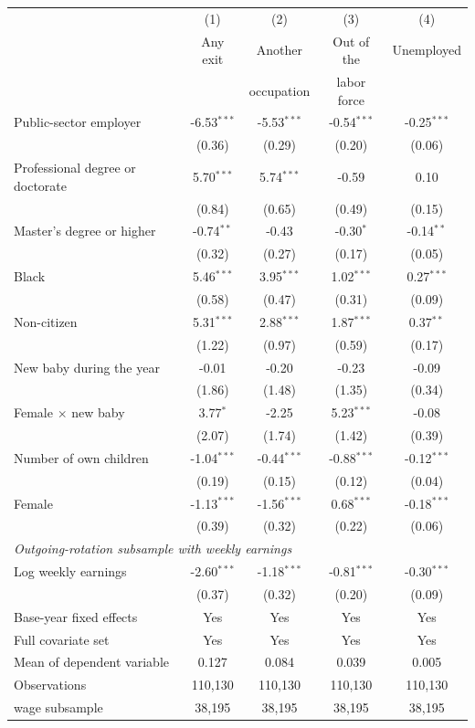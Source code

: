 \begin{tabular}{lcccc}
\toprule
 & (1) & (2) & (3) & (4) \\
 & Any exit & Another & Out of the & Unemployed \\
 & & occupation & labor force & \\
\midrule
Public-sector employer & -6.53$^{***}$ & -5.53$^{***}$ & -0.54$^{***}$ & -0.25$^{***}$ \\
 & (0.36) & (0.29) & (0.20) & (0.06) \\[2pt]
Professional degree or doctorate & 5.70$^{***}$ & 5.74$^{***}$ & -0.59 & 0.10 \\
 & (0.84) & (0.65) & (0.49) & (0.15) \\[2pt]
Master's degree or higher & -0.74$^{**}$ & -0.43 & -0.30$^{*}$ & -0.14$^{**}$ \\
 & (0.32) & (0.27) & (0.17) & (0.05) \\[2pt]
Black & 5.46$^{***}$ & 3.95$^{***}$ & 1.02$^{***}$ & 0.27$^{***}$ \\
 & (0.58) & (0.47) & (0.31) & (0.09) \\[2pt]
Non-citizen & 5.31$^{***}$ & 2.88$^{***}$ & 1.87$^{***}$ & 0.37$^{**}$ \\
 & (1.22) & (0.97) & (0.59) & (0.17) \\[2pt]
New baby during the year & -0.01 & -0.20 & -0.23 & -0.09 \\
 & (1.86) & (1.48) & (1.35) & (0.34) \\[2pt]
Female $\times$ new baby & 3.77$^{*}$ & -2.25 & 5.23$^{***}$ & -0.08 \\
 & (2.07) & (1.74) & (1.42) & (0.39) \\[2pt]
Number of own children & -1.04$^{***}$ & -0.44$^{***}$ & -0.88$^{***}$ & -0.12$^{***}$ \\
 & (0.19) & (0.15) & (0.12) & (0.04) \\[2pt]
Female & -1.13$^{***}$ & -1.56$^{***}$ & 0.68$^{***}$ & -0.18$^{***}$ \\
 & (0.39) & (0.32) & (0.22) & (0.06) \\[2pt]
\midrule
\multicolumn{5}{l}{\textit{Outgoing-rotation subsample with weekly earnings}} \\[2pt]
Log weekly earnings & -2.60$^{***}$ & -1.18$^{***}$ & -0.81$^{***}$ & -0.30$^{***}$ \\
 & (0.37) & (0.32) & (0.20) & (0.09) \\[2pt]
\midrule
Base-year fixed effects & Yes & Yes & Yes & Yes \\
Full covariate set & Yes & Yes & Yes & Yes \\
Mean of dependent variable & 0.127 & 0.084 & 0.039 & 0.005 \\
Observations & 110,130 & 110,130 & 110,130 & 110,130 \\
\quad wage subsample & 38,195 & 38,195 & 38,195 & 38,195 \\
\bottomrule
\end{tabular}
